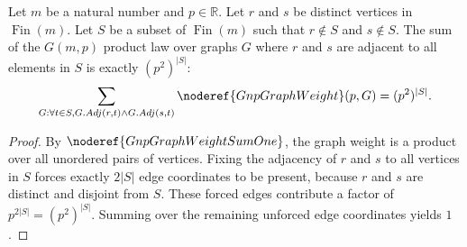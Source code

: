 \begin{helper}[GnpCylinderSum]
\label{helper:GnpCylinderSum}
Let \(m\) be a natural number and \(p \in \mathbb{R}\).
Let \(r\) and \(s\) be distinct vertices in \(\operatorname{Fin}(m)\).
Let \(S\) be a subset of \(\operatorname{Fin}(m)\) such that \(r \notin S\) and \(s \notin S\).
The sum of the \(G(m,p)\) product law over graphs \(G\) where \(r\) and \(s\) are adjacent to all elements in \(S\) is exactly \((p^2)^{|S|}\):
\[
\sum_{G : \forall t \in S, G.Adj(r,t) \land G.Adj(s,t)} \noderef{GnpGraphWeight}(p, G) = (p^2)^{|S|}.
\]
\end{helper}

\begin{proof}
By \(\noderef{GnpGraphWeightSumOne}\), the graph weight is a product over all unordered pairs of vertices.
Fixing the adjacency of \(r\) and \(s\) to all vertices in \(S\) forces exactly \(2 |S|\) edge coordinates to be present, because \(r\) and \(s\) are distinct and disjoint from \(S\).
These forced edges contribute a factor of \(p^{2|S|} = (p^2)^{|S|}\).
Summing over the remaining unforced edge coordinates yields \(1\).
\end{proof}
